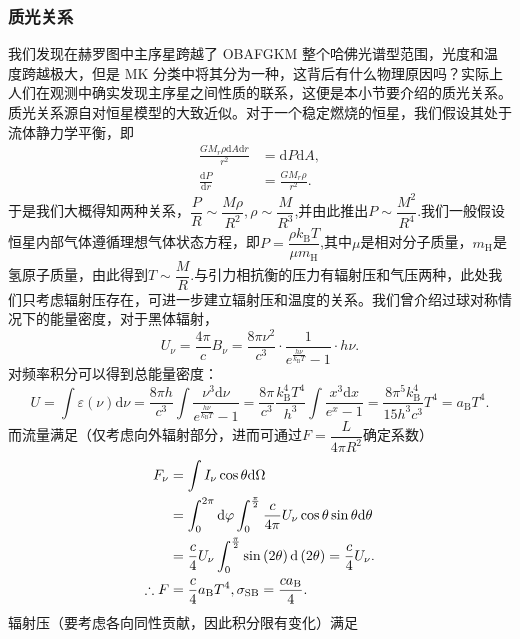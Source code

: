 \documentclass[../天体物理基础.tex]{subfiles}
\begin{document}
\subsubsection{质光关系}
我们发现在赫罗图中主序星跨越了 OBAFGKM 整个哈佛光谱型范围，光度和温度跨越极大，但是 MK 分类中将其分为一种，这背后有什么物理原因吗？实际上人们在观测中确实发现主序星之间性质的联系，这便是本小节要介绍的质光关系。质光关系源自对恒星模型的大致近似。对于一个稳定燃烧的恒星，我们假设其处于流体静力学平衡，即
\begin{align}
\frac{GM_{r}\rho\mathrm{d}A\mathrm{d}r}{r^{2}}&=\mathrm{d}P\mathrm{d}A,\\
\frac{\mathrm{d}P}{\mathrm{d}r}&=\frac{GM_{r}\rho}{r^{2}}.\label{1.4.4}
\end{align}
于是我们大概得知两种关系，$\dfrac{P}{R}\sim\dfrac{M\rho}{R^{2}},\rho\sim\dfrac{M}{R^{3}}$,并由此推出$P\sim\dfrac{M^{2}}{R^{4}}$.我们一般假设恒星内部气体遵循理想气体状态方程，即$P=\dfrac{\rho k_{\text{B}}T}{\mu m_{\mathrm{H}}}$,其中$\mu$是相对分子质量，$m_{\mathrm{H}}$是氢原子质量，由此得到$T\sim\dfrac{M}{R}$.与引力相抗衡的压力有辐射压和气压两种，此处我们只考虑辐射压存在，可进一步建立辐射压和温度的关系。我们曾介绍过球对称情况下的能量密度，对于黑体辐射，
\begin{equation}
U_{\nu}=\frac{4\pi{}}{c}B_{\nu}=\frac{8\pi\nu^{2}}{c^{3}}\cdot\frac{1}{e^{\frac{h\nu}{k_{\text{B}}T}}-1}\cdot h\nu.
\end{equation}
对频率积分可以得到总能量密度：
\begin{equation}
U=\int\varepsilon\left(\nu\right)\mathrm{d}\nu=\frac{8\pi h}{c^3}\int\frac{\nu^3\mathrm{d}\nu}{e^{\frac{h\nu}{k_{\text{B}}T}}-1}=\frac{8\pi}{c^3}\frac{k_{\text{B}}^4T^4}{h^3}\int\frac{x^3\mathrm{d}x}{e^{x}-1}=\frac{8\pi^{5}k_{\text{B}}^{4}}{15h^{3}c^{3}}T^{4}=a_{\text{B}}T^4.
\end{equation}
而流量满足（仅考虑向外辐射部分，进而可通过$F=\dfrac{L}{4\pi R^{2}}$确定系数）
\begin{align}
F_\nu&=\int I_\nu\cos\theta\mathrm{d}\Omega\notag\\
&=\int_0^{2\pi}\mathrm{d}\varphi\int_0^{\frac{\pi}{2}}\frac{c}{4\pi}U_\nu\cos\theta\sin\theta\mathrm{d}\theta\notag\\
&=\frac{c}{4}U_\nu\int_0^{\frac{\pi}{2}}\sin\left(2\theta\right)\mathrm{d}\left(2\theta\right)=\frac{c}{4}U_\nu.\\
\therefore F&=\frac{c}{4}a_{\text{B}}T^4,\sigma_{\text{SB}}=\frac{ca_{\text{B}}}{4}.
\end{align}
辐射压（要考虑各向同性贡献，因此积分限有变化）满足
\end{document}

